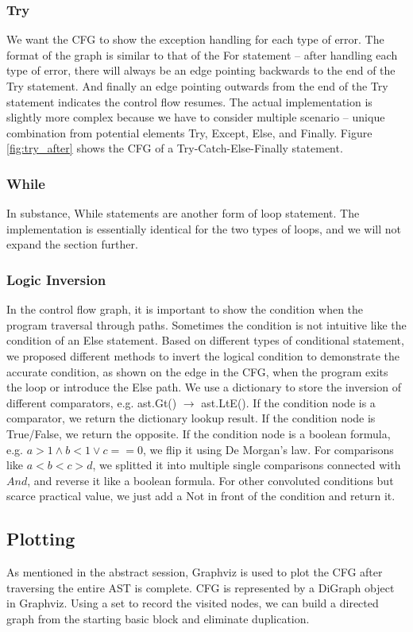\documentclass[11pt]{article}
\begin{document}
\subsubsection{Try}
We want the CFG to show the exception handling for each type of error. The format of the graph is similar to that of the For statement -- after handling each type of error, there will always be an edge pointing backwards to the end of the Try statement. And finally an edge pointing outwards from the end of the Try statement indicates the control flow resumes. The actual implementation is slightly more complex because we have to consider multiple scenario -- unique combination from potential elements Try, Except, Else, and Finally. Figure \ref{fig:try_after} shows the CFG of a Try-Catch-Else-Finally statement.

\subsubsection{While}
In substance, While statements are another form of loop statement. The implementation is essentially identical for the two types of loops, and we will not expand the section further. 


\subsubsection{Logic Inversion}
In the control flow graph, it is important to show the condition when the program traversal through paths. Sometimes the condition is not intuitive like the condition of an Else statement. Based on different types of conditional statement, we proposed different methods to invert the logical condition to demonstrate the accurate condition, as shown on the edge in the CFG, when the program exits the loop or introduce the Else path. We use a dictionary to store the inversion of different comparators, e.g. ast.Gt() $\rightarrow$ ast.LtE(). If the condition node is a comparator, we return the dictionary lookup result. If the condition node is True/False, we return the opposite. If the condition node is a boolean formula, e.g. $a>1 \land b<1 \lor c==0$, we flip it using De Morgan's law. For comparisons like $a < b < c > d$, we splitted it into multiple single comparisons connected with $And$, and reverse it like a boolean formula.  For other convoluted conditions but scarce practical value, we just add a Not in front of the condition and return it.

\subsection{Plotting}
As mentioned in the abstract session, Graphviz is used to plot the CFG after traversing the entire AST is complete. CFG is represented by a DiGraph object in Graphviz. Using a set to record the visited nodes, we can build a directed graph from the starting basic block and eliminate duplication.
\end{document}
